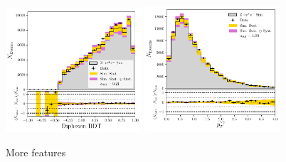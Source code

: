 \begin{figure}[h!]
\begin{center}
    \end{center}
    \begin{center}
        \includegraphics[width=0.45\textwidth]{figures/appendix_zee/dipho_bdt_zee_PS.pdf}
        \includegraphics[width=0.45\textwidth]{figures/appendix_zee/total_ptom_zee_PS.pdf}
    \end{center}
    \caption{More features}
\end{figure}


